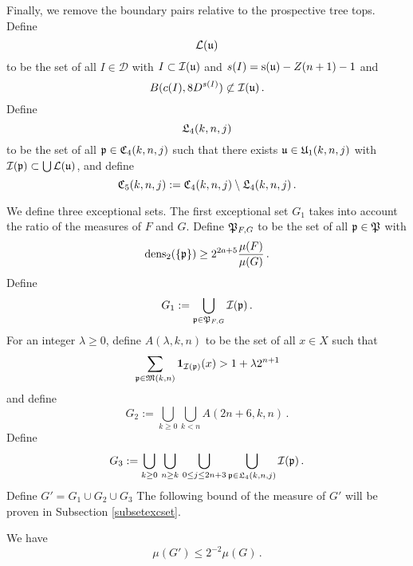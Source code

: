{Finally, we remove the boundary pairs relative to the prospective tree tops. Define
\begin{equation}
    \label{eq-L-def}
    \mathcal{L}({\mathfrak u})
\end{equation}
to be the set of all $I \in \mathcal{D}$ with $I \subset {\mathcal{I}}({\mathfrak u})$ and $s(I) = {\mathrm{s}}({\mathfrak u}) - Z(n+1) - 1$ and
\begin{equation}
    B(c(I), 8 D^{s(I)})\not \subset {\mathcal{I}}({\mathfrak u})\, .
\end{equation}
Define
\begin{equation}
    \label{eq-L4-def}
    {\mathfrak L}_4(k,n,j)
\end{equation}
to be the set of all ${\mathfrak p}\in {\mathfrak C}_4(k,n,j)$ such that there exists
${\mathfrak u}\in {\mathfrak U}_1(k,n,j)$
with ${\mathcal{I}}({\mathfrak p}) \subset \bigcup \mathcal{L}({\mathfrak u})$, and define
\begin{equation}\label{defc5}
{\mathfrak C}_5(k,n,j):={\mathfrak C}_4(k,n,j)
  \setminus {\mathfrak L}_4(k,n,j)\, .
\end{equation}


We define three exceptional sets.
The first exceptional set $G_1$ takes into account the ratio of the measures of $F$ and $G$.
Define ${\mathfrak P}_{F,G}$ to be the set of all ${\mathfrak p}\in {\mathfrak P}$
with
\begin{equation}
    \operatorname{\operatorname{dens}}_2(\{{\mathfrak p}\})\ge 2^{2a+5}\frac{\mu(F)}{\mu(G)}\,.
\end{equation}
Define
\begin{equation}\label{definegone}
    G_1:=\bigcup_{{\mathfrak p}\in {\mathfrak P}_{F,G} }{\mathcal{I}}({\mathfrak p})\, .
\end{equation}
For an integer $\lambda\ge 0$, define  $A(\lambda,k,n)$ to be the set  of all $x\in X$ such that
\begin{equation}
    \label{eq-Aoverlap-def}
    \sum_{{\mathfrak p} \in \mathfrak{M}(k,n)}\mathbf{1}_{{\mathcal{I}}({\mathfrak p})}(x)>1+\lambda 2^{n+1}
\end{equation}
and define
\begin{equation}\label{definegone2}
    G_2:=
\bigcup_{k\ge  0}\bigcup_{k< n}
A(2n+6,k,n)\, .
\end{equation}
Define
    \begin{equation}\label{defineg3}
        G_3 :=
        \bigcup_{k\ge 0}\, \bigcup_{n \geq k}\,
        \bigcup_{0\le j\le 2n+3}
        \bigcup_{{\mathfrak p} \in {\mathfrak L}_4 (k,n,j)}
        {\mathcal{I}}({\mathfrak p})\, .
     \end{equation}
Define $G'=G_1\cup G_2 \cup G_3$
The following bound of the measure of $G'$ will be proven in
Subsection \ref{subsetexcset}.
\begin{lemma}
\label{exceptional-set}
We have
\begin{equation}
    \mu(G')\le 2^{-2}\mu(G)\, .
\end{equation}
\end{lemma}

}
